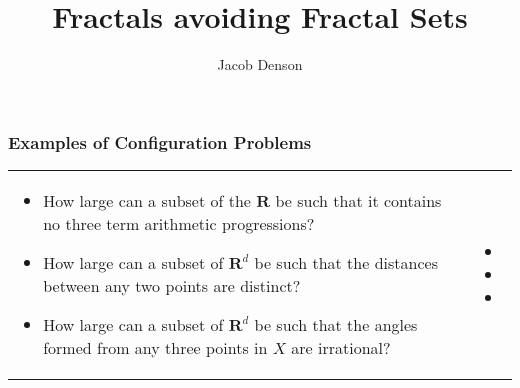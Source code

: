 \documentclass{beamer}
\title{Fractals avoiding Fractal Sets}
\author{Jacob Denson}
\institute{University of British Columbia}
\begin{document}
\maketitle

\begin{frame}
  \frametitle{Examples of Configuration Problems}

\begin{tabular}{p{}p{}}

\begin{itemize}
     \item How large can a subset of the $\mathbf{R}$ be such that it contains no three term arithmetic progressions?

     \pause
     \item How large can a subset of $\mathbf{R}^d$ be such that the distances between any two points are distinct?

     \pause
     \item How large can a subset of $\mathbf{R}^d$ be such that the angles formed from any three points in $X$ are irrational?
  \end{itemize} &

\begin{itemize}
  \item[]

  \item[]

    \item[]

\end{itemize} \\

\end{tabular}

\end{frame}
\end{document}
